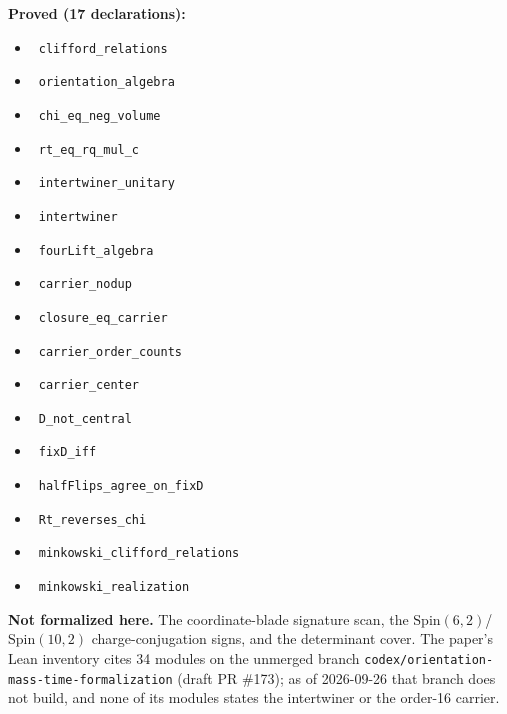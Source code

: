 \documentclass{report}
\theoremstyle{definition}
\begin{document}
\begin{itemize}
\begin{itemize}
\noindent\textbf{Proved (17 declarations):}
\begin{itemize}
  \item {}\leanok\ \texttt{clifford\_relations}
  \item {}\leanok\ \texttt{orientation\_algebra}
  \item {}\leanok\ \texttt{chi\_eq\_neg\_volume}
  \item {}\leanok\ \texttt{rt\_eq\_rq\_mul\_c}
  \item {}\leanok\ \texttt{intertwiner\_unitary}
  \item {}\leanok\ \texttt{intertwiner}
  \item {}\leanok\ \texttt{fourLift\_algebra}
  \item {}\leanok\ \texttt{carrier\_nodup}
  \item {}\leanok\ \texttt{closure\_eq\_carrier}
  \item {}\leanok\ \texttt{carrier\_order\_counts}
  \item {}\leanok\ \texttt{carrier\_center}
  \item {}\leanok\ \texttt{D\_not\_central}
  \item {}\leanok\ \texttt{fixD\_iff}
  \item {}\leanok\ \texttt{halfFlips\_agree\_on\_fixD}
  \item {}\leanok\ \texttt{Rt\_reverses\_chi}
  \item {}\leanok\ \texttt{minkowski\_clifford\_relations}
  \item {}\leanok\ \texttt{minkowski\_realization}
\end{itemize}

\noindent\textbf{Not formalized here.} The coordinate-blade signature scan, the
$\mathrm{Spin}(6,2)$/$\mathrm{Spin}(10,2)$ charge-conjugation signs, and the determinant cover.
The paper's Lean inventory cites 34 modules on the unmerged branch
\texttt{codex/orientation-mass-time-formalization} (draft PR \#173); as of 2026-09-26 that
branch does not build, and none of its modules states the intertwiner or the order-16 carrier.


\end{itemize}
\end{itemize}
\end{document}
